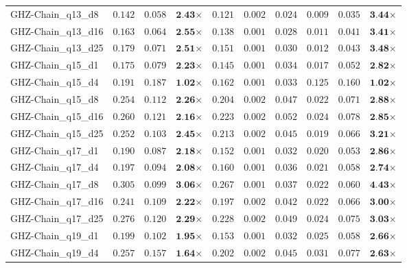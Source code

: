 \begin{table*}[t]
{\begin{tabular}{| l || r r c || r r r r r c |}
GHZ-Chain\_q13\_d8 & $0.142$ & $0.058$ & $\textbf{2.43}$$\times$ & $0.121$ & $0.002$ & $0.024$ & $0.009$ & $0.035$ & $\textbf{3.44}$$\times$ \\
GHZ-Chain\_q13\_d16 & $0.163$ & $0.064$ & $\textbf{2.55}$$\times$ & $0.138$ & $0.001$ & $0.028$ & $0.011$ & $0.041$ & $\textbf{3.41}$$\times$ \\
GHZ-Chain\_q13\_d25 & $0.179$ & $0.071$ & $\textbf{2.51}$$\times$ & $0.151$ & $0.001$ & $0.030$ & $0.012$ & $0.043$ & $\textbf{3.48}$$\times$ \\
GHZ-Chain\_q15\_d1 & $0.175$ & $0.079$ & $\textbf{2.23}$$\times$ & $0.145$ & $0.001$ & $0.034$ & $0.017$ & $0.052$ & $\textbf{2.82}$$\times$ \\
GHZ-Chain\_q15\_d4 & $0.191$ & $0.187$ & $\textbf{1.02}$$\times$ & $0.162$ & $0.001$ & $0.033$ & $0.125$ & $0.160$ & $\textbf{1.02}$$\times$ \\
GHZ-Chain\_q15\_d8 & $0.254$ & $0.112$ & $\textbf{2.26}$$\times$ & $0.204$ & $0.002$ & $0.047$ & $0.022$ & $0.071$ & $\textbf{2.88}$$\times$ \\
GHZ-Chain\_q15\_d16 & $0.260$ & $0.121$ & $\textbf{2.16}$$\times$ & $0.223$ & $0.002$ & $0.052$ & $0.024$ & $0.078$ & $\textbf{2.85}$$\times$ \\
GHZ-Chain\_q15\_d25 & $0.252$ & $0.103$ & $\textbf{2.45}$$\times$ & $0.213$ & $0.002$ & $0.045$ & $0.019$ & $0.066$ & $\textbf{3.21}$$\times$ \\
GHZ-Chain\_q17\_d1 & $0.190$ & $0.087$ & $\textbf{2.18}$$\times$ & $0.152$ & $0.001$ & $0.032$ & $0.020$ & $0.053$ & $\textbf{2.86}$$\times$ \\
GHZ-Chain\_q17\_d4 & $0.197$ & $0.094$ & $\textbf{2.08}$$\times$ & $0.160$ & $0.001$ & $0.036$ & $0.021$ & $0.058$ & $\textbf{2.74}$$\times$ \\
GHZ-Chain\_q17\_d8 & $0.305$ & $0.099$ & $\textbf{3.06}$$\times$ & $0.267$ & $0.001$ & $0.037$ & $0.022$ & $0.060$ & $\textbf{4.43}$$\times$ \\
GHZ-Chain\_q17\_d16 & $0.241$ & $0.109$ & $\textbf{2.22}$$\times$ & $0.197$ & $0.002$ & $0.042$ & $0.022$ & $0.066$ & $\textbf{3.00}$$\times$ \\
GHZ-Chain\_q17\_d25 & $0.276$ & $0.120$ & $\textbf{2.29}$$\times$ & $0.228$ & $0.002$ & $0.049$ & $0.024$ & $0.075$ & $\textbf{3.03}$$\times$ \\
GHZ-Chain\_q19\_d1 & $0.199$ & $0.102$ & $\textbf{1.95}$$\times$ & $0.153$ & $0.001$ & $0.032$ & $0.025$ & $0.058$ & $\textbf{2.66}$$\times$ \\
GHZ-Chain\_q19\_d4 & $0.257$ & $0.157$ & $\textbf{1.64}$$\times$ & $0.202$ & $0.002$ & $0.045$ & $0.031$ & $0.077$ & $\textbf{2.63}$$\times$ \\

\end{tabular}}
\end{table*}
